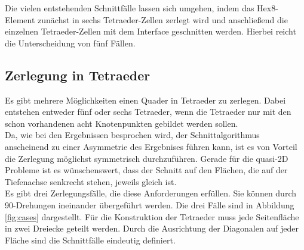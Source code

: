 Die vielen entstehenden Schnittfälle lassen sich umgehen, indem das Hex8-Element zunächst in sechs Tetraeder-Zellen zerlegt wird und anschließend die einzelnen Tetraeder-Zellen mit dem Interface geschnitten werden. Hierbei reicht die Unterscheidung von fünf Fällen.

\subsection{Zerlegung in Tetraeder}
Es gibt mehrere Möglichkeiten einen Quader in Tetraeder zu zerlegen. Dabei entstehen entweder fünf oder sechs Tetraeder, wenn die Tetraeder nur mit den schon vorhandenen acht Knotenpunkten gebildet werden sollen.\\

Da, wie bei den Ergebnissen besprochen wird, der Schnittalgorithmus anscheinend zu einer Asymmetrie des Ergebnises führen kann, ist es von Vorteil die Zerlegung möglichst symmetrisch durchzuführen. Gerade für die quasi-2D Probleme ist es wünschenswert, dass der Schnitt auf den Flächen, die auf der Tiefenachse senkrecht stehen, jeweils gleich ist.\\

Es gibt drei Zerlegungsfälle, die diese Anforderungen erfüllen. Sie können durch 90\textdegree-Drehungen ineinander übergeführt werden. Die drei Fälle sind in Abbildung \ref{fig:cases} dargestellt. Für die Konstruktion der Tetraeder muss jede Seitenfläche in zwei Dreiecke geteilt werden. Durch die Ausrichtung der Diagonalen auf jeder Fläche sind die Schnittfälle eindeutig definiert.\\

